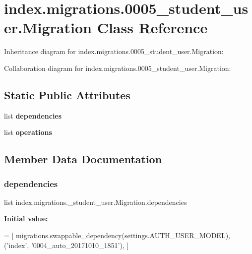 \hypertarget{classindex_1_1migrations_1_10005__student__user_1_1Migration}{}\section{index.\+migrations.0005\+\_\+student\+\_\+user.Migration Class Reference}
\label{classindex_1_1migrations_1_10005__student__user_1_1Migration}


Inheritance diagram for index.\+migrations.0005\+\_\+student\+\_\+user.Migration\+:


Collaboration diagram for index.\+migrations.0005\+\_\+student\+\_\+user.Migration\+:
\subsection*{Static Public Attributes}
\begin{DoxyCompactItemize}
\item 
list {\bfseries dependencies}
\item 
list {\bfseries operations}
\end{DoxyCompactItemize}


\subsection{Member Data Documentation}
\mbox{\label{classindex_1_1migrations_1_10005__student__user_1_1Migration_ab5f88c35e9f833b253d672220697fd1e}} 
\subsubsection{\texorpdfstring{dependencies}{dependencies}}
{\footnotesize\ttfamily list index.\+migrations.\+\_\+student\+\_\+user.\+Migration.\+dependencies\hspace{0.3cm}{\ttfamily [static]}}

{\bfseries Initial value\+:}
\begin{DoxyCode}
=  [
        migrations.swappable\_dependency(settings.AUTH\_USER\_MODEL),
        (\textcolor{stringliteral}{'index'}, \textcolor{stringliteral}{'0004\_auto\_20171010\_1851'}),
    ]
\end{DoxyCode}
\mbox{\label{classindex_1_1migrations_1_10005__student__user_1_1Migration_ae1265a95e20e745d974e3b925ee9c86c}} 
